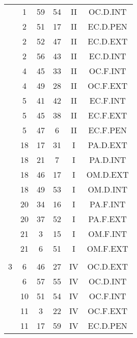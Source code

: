 \documentclass[12pt, a4paper]{article}
\begin{document}
\begin{multicols}{3}
{\begin{tabular}{c c c c c c}
	 	 	 	 & 1 & 59 & 54 & II & OC.D.INT\\%
	 	 	 	 & 2 & 51 & 17 & II & EC.D.PEN\\%
	 	 	 	 & 2 & 52 & 47 & II & EC.D.EXT\\%
	 	 	 	 & 2 & 56 & 43 & II & EC.D.INT\\%
	 	 	 	 & 4 & 45 & 33 & II & OC.F.INT\\%
	 	 	 	 & 4 & 49 & 28 & II & OC.F.EXT\\%
	 	 	 	 & 5 & 41 & 42 & II & EC.F.INT\\%
	 	 	 	 & 5 & 45 & 38 & II & EC.F.EXT\\%
	 	 	 	 & 5 & 47 & 6 & II & EC.F.PEN\\%
	 	 	 	 & 18 & 17 & 31 & I & PA.D.EXT\\%
	 	 	 	 & 18 & 21 & 7 & I & PA.D.INT\\%
	 	 	 	 & 18 & 46 & 17 & I & OM.D.EXT\\%
	 	 	 	 & 18 & 49 & 53 & I & OM.D.INT\\%
	 	 	 	 & 20 & 34 & 16 & I & PA.F.INT\\%
	 	 	 	 & 20 & 37 & 52 & I & PA.F.EXT\\%
	 	 	 	 & 21 & 3 & 15 & I & OM.F.INT\\%
	 	 	 	 & 21 & 6 & 51 & I & OM.F.EXT\\%
	 	 	 	 & & & & & \\%
	 	 	 	3 & 6 & 46 & 27 & IV & OC.D.EXT\\%
	 	 	 	 & 6 & 57 & 55 & IV & OC.D.INT\\%
	 	 	 	 & 10 & 51 & 54 & IV & OC.F.INT\\%
	 	 	 	 & 11 & 3 & 22 & IV & OC.F.EXT\\%
	 	 	 	 & 11 & 17 & 59 & IV & EC.D.PEN\\%

\end{tabular}}
\end{multicols}
\end{document}
